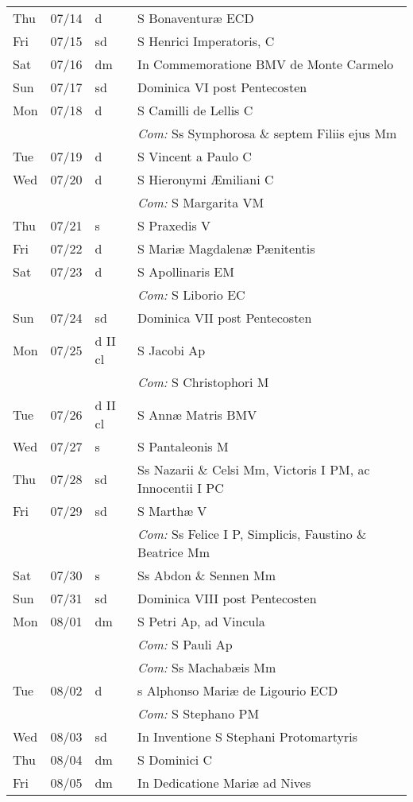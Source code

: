 \documentclass[10pt]{article}
\begin{document}
\begin{longtable}{ l l l l }
Thu & 07/14 & d & S Bonaventuræ ECD\\
Fri & 07/15 & sd & S Henrici Imperatoris, C\\
Sat & 07/16 & dm & In Commemoratione BMV de Monte Carmelo\\
Sun & 07/17 & sd & Dominica VI post Pentecosten\\
Mon & 07/18 & d & S Camilli de Lellis C\\
 & & & \textit{Com:} Ss Symphorosa \& septem Filiis ejus Mm\\
Tue & 07/19 & d & S Vincent a Paulo C\\
Wed & 07/20 & d & S Hieronymi Æmiliani C\\
 & & & \textit{Com:} S Margarita VM\\
Thu & 07/21 & s & S Praxedis V\\
Fri & 07/22 & d & S Mariæ Magdalenæ Pænitentis\\
Sat & 07/23 & d & S Apollinaris EM\\
 & & & \textit{Com:} S Liborio EC\\
Sun & 07/24 & sd & Dominica VII post Pentecosten\\
Mon & 07/25 & d II cl & S Jacobi Ap\\
 & & & \textit{Com:} S Christophori M\\
Tue & 07/26 & d II cl & S Annæ Matris BMV\\
Wed & 07/27 & s & S Pantaleonis M\\
Thu & 07/28 & sd & Ss Nazarii \& Celsi Mm, Victoris I PM, ac Innocentii I PC\\
Fri & 07/29 & sd & S Marthæ V\\
 & & & \textit{Com:} Ss Felice I P, Simplicis, Faustino \& Beatrice Mm\\
Sat & 07/30 & s & Ss Abdon \& Sennen Mm\\
Sun & 07/31 & sd & Dominica VIII post Pentecosten\\
Mon & 08/01 & dm & S Petri Ap, ad Vincula\\
 & & & \textit{Com:} S Pauli Ap\\
 & & & \textit{Com:} Ss Machabæis Mm\\
Tue & 08/02 & d & s Alphonso Mariæ de Ligourio ECD\\
 & & & \textit{Com:} S Stephano PM\\
Wed & 08/03 & sd & In Inventione S Stephani Protomartyris\\
Thu & 08/04 & dm & S Dominici C\\
Fri & 08/05 & dm & In Dedicatione Mariæ ad Nives\\

\end{longtable}
\end{document}
